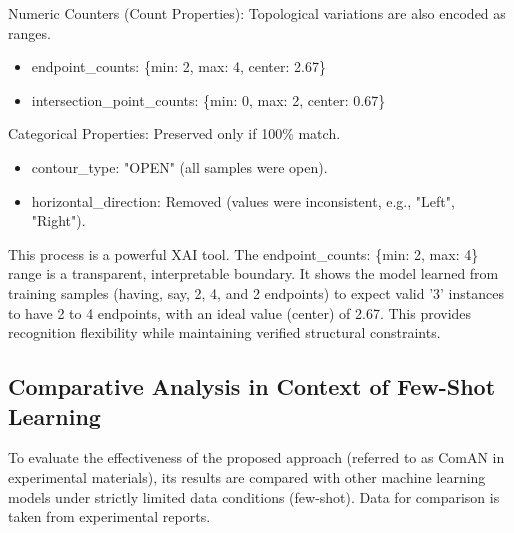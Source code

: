 \documentclass[conference]{IEEEtran}
\begin{document}
Numeric Counters (Count Properties): Topological variations are also encoded as ranges.
\begin{itemize}
    \item endpoint\_counts: \{min: 2, max: 4, center: 2.67\}
    \item intersection\_point\_counts: \{min: 0, max: 2, center: 0.67\}
\end{itemize}

Categorical Properties: Preserved only if 100\% match.
\begin{itemize}
    \item contour\_type: "OPEN" (all samples were open).
    \item horizontal\_direction: Removed (values were inconsistent, e.g., "Left", "Right").
\end{itemize}
This process is a powerful XAI tool. The endpoint\_counts: \{min: 2, max: 4\} range is a transparent, interpretable boundary. It shows the model learned from training samples (having, say, 2, 4, and 2 endpoints) to expect valid '3' instances to have 2 to 4 endpoints, with an ideal value (center) of 2.67. This provides recognition flexibility while maintaining verified structural constraints.

\subsection{Comparative Analysis in Context of Few-Shot Learning}
To evaluate the effectiveness of the proposed approach (referred to as ComAN in experimental materials), its results are compared with other machine learning models under strictly limited data conditions (few-shot). Data for comparison is taken from experimental reports.

\begin{table}[t]
\centering
\caption{Comparative Table}
\end{table}
\end{document}
